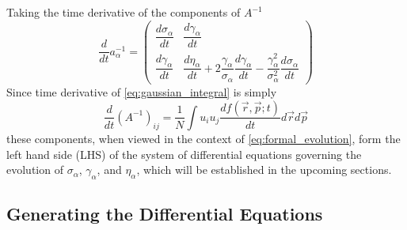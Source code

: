 Taking the time derivative of the components of $A^{-1}$
\begin{equation} \label{eq:dainvdt}
  \frac{d}{dt} a^{-1}_{\alpha} = 
  \begin{pmatrix}
    \dfrac{d\sigma_{\alpha}}{dt} & \dfrac{d\gamma_{\alpha}}{dt} \\
    \dfrac{d\gamma_{\alpha}}{dt} & \dfrac{d\eta_{\alpha}}{dt} + 2\dfrac{\gamma_{\alpha}}{\sigma_{\alpha}}\dfrac{d\gamma_{\alpha}}{dt}- \dfrac{\gamma^{2}_{\alpha}}{\sigma^{2}_{\alpha}}\dfrac{d\sigma_{\alpha}}{dt}
  \end{pmatrix}
\end{equation}
Since time derivative of \ref{eq:gaussian_integral} is simply
\begin{equation} \label{eq:gaussian_integral_dt}
  \frac{d}{dt}(A^{-1})_{ij} = \frac{1}{N} \int u_i u_j \frac{df(\vec{r}, \vec{p}; t)}{dt} d\vec{r} d\vec{p}
\end{equation}
these components, when viewed in the context of \ref{eq:formal_evolution}, form the left hand side (LHS) of the system of differential equations governing the evolution of $\sigma_{\alpha}$, $\gamma_{\alpha}$, and $\eta_{\alpha}$, which will be established in the upcoming sections.

\subsection{Generating the Differential Equations}

